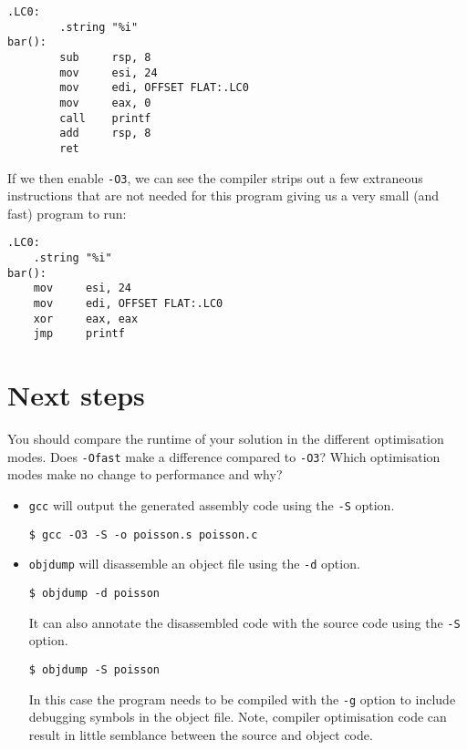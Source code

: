 \documentclass[a4paper,11pt]{article}
\newcommand{\code}[1]{\texttt{#1}}
\begin{document}
\begin{verbatim}
.LC0:
        .string "%i"
bar():
        sub     rsp, 8
        mov     esi, 24
        mov     edi, OFFSET FLAT:.LC0
        mov     eax, 0
        call    printf
        add     rsp, 8
        ret
\end{verbatim}

If we then enable \code{-O3}, we can see the compiler strips out a few
extraneous instructions that are not needed for this program giving us a very
small (and fast) program to run:

\begin{verbatim}
.LC0:
    .string "%i"
bar():
    mov     esi, 24
    mov     edi, OFFSET FLAT:.LC0
    xor     eax, eax
    jmp     printf
\end{verbatim}

\section{Next steps}

You should compare the runtime of your solution in the different optimisation
modes. Does \code{-Ofast} make a difference compared to \code{-O3}? Which
optimisation modes make no change to performance and why?

\begin{itemize}
\item \code{gcc} will output the generated assembly code using the \code{-S} option.

\begin{verbatim}
$ gcc -O3 -S -o poisson.s poisson.c
\end{verbatim}

\item \code{objdump} will disassemble an object file using the \code{-d} option.

\begin{verbatim}
$ objdump -d poisson
\end{verbatim}

It can also annotate the disassembled code with the source code using
the \code{-S} option.

\begin{verbatim}
$ objdump -S poisson
\end{verbatim}

In this case the program needs to be compiled with the \code{-g}
option to include debugging symbols in the object file.  Note,
compiler optimisation code can result in little semblance between the
source and object code.

\end{itemize}
\end{document}

